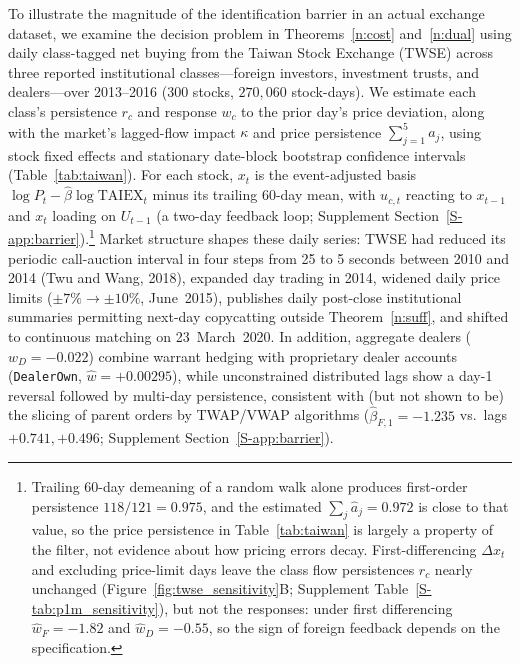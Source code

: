 \documentclass[11pt,letterpaper]{article}
\theoremstyle{definition}
\begin{document}
To illustrate the magnitude of the identification barrier in an actual exchange dataset, we examine the decision problem in Theorems~\ref{n:cost} and~\ref{n:dual} using daily class-tagged net buying from the Taiwan Stock Exchange (TWSE) across three reported institutional classes---foreign investors, investment trusts, and dealers---over 2013--2016 ($300$ stocks, $270{,}060$ stock-days). We estimate each class's persistence $r_c$ and response $w_c$ to the prior day's price deviation, along with the market's lagged-flow impact $\kappa$ and price persistence $\sum_{j=1}^5 a_j$, using stock fixed effects and stationary date-block bootstrap confidence intervals (Table~\ref{tab:taiwan}). For each stock, $x_t$ is the event-adjusted basis $\log P_t - \hat\beta \log\mathrm{TAIEX}_t$ minus its trailing 60-day mean, with $u_{c,t}$ reacting to $x_{t-1}$ and $x_t$ loading on $U_{t-1}$ (a two-day feedback loop; Supplement Section~\ref{S-app:barrier}).\footnote{\label{fn:persist}Trailing 60-day demeaning of a random walk alone produces first-order persistence $118/121 = 0.975$, and the estimated $\sum_j \hat a_j = 0.972$ is close to that value, so the price persistence in Table~\ref{tab:taiwan} is largely a property of the filter, not evidence about how pricing errors decay. First-differencing $\Delta x_t$ and excluding price-limit days leave the class flow persistences $\hat r_c$ nearly unchanged (Figure~\ref{fig:twse_sensitivity}B; Supplement Table~\ref{S-tab:p1m_sensitivity}), but not the responses: under first differencing $\hat w_F = -1.82$ and $\hat w_D = -0.55$, so the sign of foreign feedback depends on the specification.} Market structure shapes these daily series: TWSE had reduced its periodic call-auction interval in four steps from 25 to 5 seconds between 2010 and 2014 (Twu and Wang, 2018), expanded day trading in 2014, widened daily price limits ($\pm 7\%\to\pm 10\%$, June~2015), publishes daily post-close institutional summaries permitting next-day copycatting outside Theorem~\ref{n:suff}, and shifted to continuous matching on 23~March~2020. In addition, aggregate dealers ($w_D = -0.022$) combine warrant hedging with proprietary dealer accounts (\texttt{DealerOwn}, $\hat w = +0.00295$), while unconstrained distributed lags show a day-1 reversal followed by multi-day persistence, consistent with (but not shown to be) the slicing of parent orders by TWAP/VWAP algorithms ($\hat\beta_{F,1} = -1.235$ vs.\ lags $+0.741, +0.496$; Supplement Section~\ref{S-app:barrier}).
\end{document}
